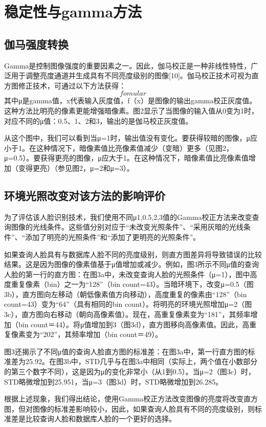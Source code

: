
\chapter{稳定性与gamma方法}
\label{chap03}
\section{伽马强度转换}
Gamma是控制图像强度的重要因素之一。因此，伽马校正是一种非线性特性，广泛用于调整亮度通道并生成具有不同亮度级别的图像[10]。伽马校正技术可视为直方图修正技术，可通过以下方法获得：
\begin{equation}
fomular
\end{equation}
其中μ是gamma值，x代表输入灰度值，f（x）是图像的输出gamma校正灰度值。这种方法比明亮的像素更能增强暗像素。图2显示了当图像的输入值从0变为1时，对应不同的μ值：0.5、1、2和3，输出的是伽马校正灰度值。

从这个图中，我们可以看到当μ=1时，输出值没有变化。要获得较暗的图像，μ应小于1。在这种情况下，暗像素值比亮像素值减少（变暗）更多（见图2，μ=0.5）。要获得更亮的图像，μ应大于1。在这种情况下，暗像素值比亮像素值增加（变得更亮）（参见图2，μ=2和μ=3）。
\section{环境光照改变对该方法的影响评价}
为了评估该人脸识别技术，我们使用不同μ{1,0.5,2,3}值的Gamma校正方法来改变查询图像的光线条件。这些值分别对应于“未改变光照条件”、“采用灰暗的光线条件”、“添加了明亮的光照条件”和“添加了更明亮的光照条件”。

如果查询人脸具有与数据库人脸不同的亮度级别，则直方图差异将导致错误的比较结果。这是因为图像的像素值基于μ值增加或减少。例如，图3所示不同μ值的查询人脸的第一行的直方图：在图3a中，未改变查询人脸的光照条件（μ=1），图中高度重复像素（bin）之一为“128”（bin count=43）。当暗环境下，改变μ=0.5（图3b），直方图向左移动（朝低像素值方向移动），高度重复的像素由“128”（bin count=43）变为“64”（具有相同的bin count）。将明亮的环境光照增加μ=2（图3c），直方图向右移动（朝向高像素值）。现在，高重复像素变为“181”，其频率增加（bin count＝44）。将μ值增加到3（图3d），直方图移向高像素值。因此，高重复像素变为“202”，其频率增加（bin count＝49）。

图3还揭示了不同μ值的查询人脸直方图的标准差：在图3a中，第一行直方图的标准差为25.92。在图3b中，STD几乎与在图3a中相同（实际上，两个值在小数部分的第三个数字不同），这是因为μ的变化非常小（从1到0.5）。当μ=2（图3c）时，STD略微增加到25.951，当μ=3（图3d）时，STD略微增加到26.285。

根据上述现象，我们得出结论，使用Gamma校正方法改变图像的亮度将改变直方图，但对图像的标准差影响较小，因此，如果查询人脸具有不同的亮度级别，则标准差是比较查询人脸和数据库人脸的一个更好的选择。




